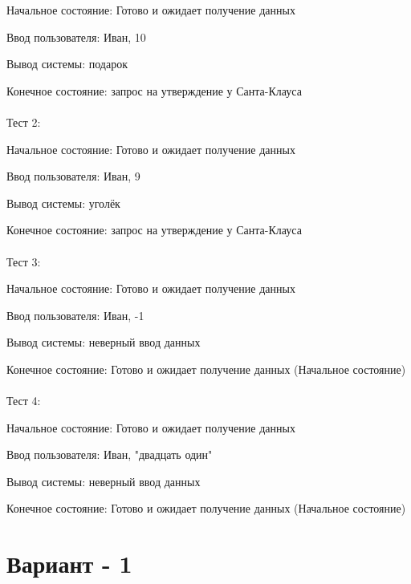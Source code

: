 \documentclass{article}
\begin{document}
Начальное состояние: Готово и ожидает получение данных

Ввод пользователя: Иван, 10

Вывод системы: подарок

Конечное состояние: запрос на утверждение у Санта-Клауса
\\ \\
Тест 2:

Начальное состояние: Готово и ожидает получение данных

Ввод пользователя: Иван, 9

Вывод системы: уголёк

Конечное состояние: запрос на утверждение у Санта-Клауса
\\ \\
Тест 3:

Начальное состояние: Готово и ожидает получение данных

Ввод пользователя: Иван, -1

Вывод системы: неверный ввод данных

Конечное состояние: Готово и ожидает получение данных (Начальное состояние)
\\ \\
Тест 4:

Начальное состояние: Готово и ожидает получение данных

Ввод пользователя: Иван, "двадцать один"

Вывод системы: неверный ввод данных

Конечное состояние: Готово и ожидает получение данных (Начальное состояние)

\section[Рубеж]{Вариант - 1}
\end{document}
